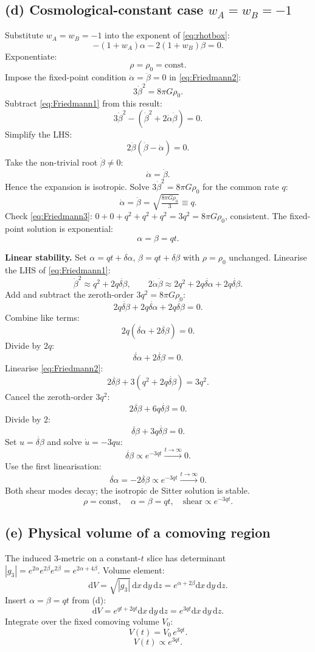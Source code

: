 \documentclass[11pt]{article}
\newcommand{\de}{\mathrm{d}}
\begin{document}
\subsection*{(d) Cosmological-constant case $w_A=w_B=-1$}

Substitute $w_A=w_B=-1$ into the exponent of \eqref{eq:rhotbox}:
\[
-(1+w_A)\alpha-2(1+w_B)\beta=0.
\]
Exponentiate:
\[
\rho=\rho_0=\text{const}.
\]
Impose the fixed-point condition $\ddot\alpha=\ddot\beta=0$ in \eqref{eq:Friedmann2}:
\[
3\dot\beta^2=8\pi G\rho_0.
\]
Subtract \eqref{eq:Friedmann1} from this result:
\[
3\dot\beta^2-(\dot\beta^2+2\dot\alpha\dot\beta)=0.
\]
Simplify the LHS:
\[
2\dot\beta(\dot\beta-\dot\alpha)=0.
\]
Take the non-trivial root $\dot\beta\neq 0$:
\[
\dot\alpha=\dot\beta.
\]
Hence the expansion is isotropic. Solve $3\dot\beta^2=8\pi G\rho_0$ for the common rate $q$:
\[
\dot\alpha=\dot\beta=\sqrt{\tfrac{8\pi G\rho_0}{3}}\equiv q.
\]
Check \eqref{eq:Friedmann3}: $0+0+q^2+q^2+q^2=3q^2=8\pi G\rho_0$, consistent. The fixed-point solution is exponential:
\[
\alpha=\beta=qt.
\]

\textbf{Linear stability.} Set $\alpha=qt+\delta\alpha$, $\beta=qt+\delta\beta$ with $\rho=\rho_0$ unchanged. Linearise the LHS of \eqref{eq:Friedmann1}:
\[
\dot\beta^2\approx q^2+2q\dot{\delta\beta},\qquad 2\dot\alpha\dot\beta\approx 2q^2+2q\dot{\delta\alpha}+2q\dot{\delta\beta}.
\]
Add and subtract the zeroth-order $3q^2=8\pi G\rho_0$:
\[
2q\dot{\delta\beta}+2q\dot{\delta\alpha}+2q\dot{\delta\beta}=0.
\]
Combine like terms:
\[
2q(\dot{\delta\alpha}+2\dot{\delta\beta})=0.
\]
Divide by $2q$:
\[
\dot{\delta\alpha}+2\dot{\delta\beta}=0.
\]
Linearise \eqref{eq:Friedmann2}:
\[
2\ddot{\delta\beta}+3(q^2+2q\dot{\delta\beta})=3q^2.
\]
Cancel the zeroth-order $3q^2$:
\[
2\ddot{\delta\beta}+6q\dot{\delta\beta}=0.
\]
Divide by $2$:
\[
\ddot{\delta\beta}+3q\dot{\delta\beta}=0.
\]
Set $u=\dot{\delta\beta}$ and solve $\dot u=-3qu$:
\[
\dot{\delta\beta}\propto e^{-3qt}\xrightarrow{t\to\infty}0.
\]
Use the first linearisation:
\[
\dot{\delta\alpha}=-2\dot{\delta\beta}\propto e^{-3qt}\xrightarrow{t\to\infty}0.
\]
Both shear modes decay; the isotropic de Sitter solution is stable.
\[
\boxed{\ \rho=\text{const},\quad \alpha=\beta=qt,\quad \text{shear}\propto e^{-3qt}.\ }
\]

\subsection*{(e) Physical volume of a comoving region}

The induced 3-metric on a constant-$t$ slice has determinant $|g_3|=e^{2\alpha}e^{2\beta}e^{2\beta}=e^{2\alpha+4\beta}$. Volume element:
\[
\de V=\sqrt{|g_3|}\,\de x\,\de y\,\de z=e^{\alpha+2\beta}\de x\,\de y\,\de z.
\]
Insert $\alpha=\beta=qt$ from (d):
\[
\de V=e^{qt+2qt}\de x\,\de y\,\de z=e^{3qt}\de x\,\de y\,\de z.
\]
Integrate over the fixed comoving volume $V_0$:
\[
V(t)=V_0\,e^{3qt}.
\]
\begin{equation}
\boxed{\ V(t)\propto e^{3qt}.\ }
\label{eq:Vbox}
\end{equation}
\end{document}
